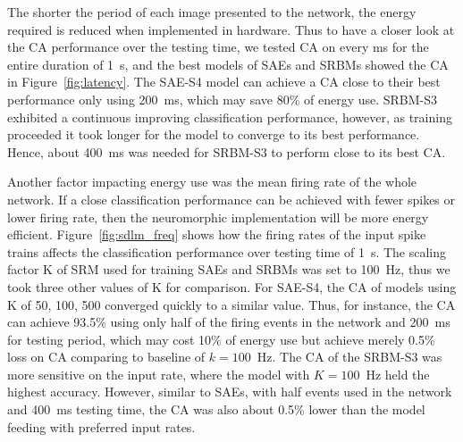 The shorter the period of each image presented to the network, the energy required is reduced when implemented in hardware.
Thus to have a closer look at the CA performance over the testing time, we tested CA on every ms for the entire duration of 1~s, and the best models of SAEs and SRBMs showed the CA in Figure~\ref{fig:latency}.
The SAE-S4 model can achieve a CA close to their best performance only using 200~ms, which may save 80\% of energy use.
SRBM-S3 exhibited a continuous improving classification performance, however, as training proceeded it took longer for the model to converge to its best performance.
Hence, about 400~ms was needed for SRBM-S3 to perform close to its best CA.

Another factor impacting energy use was the mean firing rate of the whole network.
If a close classification performance can be achieved with fewer spikes or lower firing rate, then the neuromorphic implementation will be more energy efficient.
Figure~\ref{fig:sdlm_freq} shows how the firing rates of the input spike trains affects the classification performance over testing time of 1~s.
The scaling factor K of SRM used for training SAEs and SRBMs was set to 100~Hz, thus we took three other values of K for comparison.
For SAE-S4, the CA of models using K of 50, 100, 500 converged quickly to a similar value.
Thus, for instance, the CA can achieve 93.5\% using only half of the firing events in the network and 200~ms for testing period, which may cost 10\% of energy use but achieve merely 0.5\% loss on CA comparing to baseline of $k=100$~Hz.
The CA of the SRBM-S3 was more sensitive on the input rate, where the model with $K=100$~Hz held the highest accuracy.
However, similar to SAEs, with half events used in the network and 400~ms testing time, the CA was also about 0.5\% lower than the model feeding with preferred input rates.

